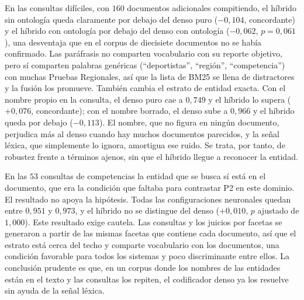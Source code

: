 \documentclass[11pt,letterpaper]{article}
\numberwithin{equation}{section}
\begin{document}
En las consultas difíciles, con $160$ documentos adicionales compitiendo, el híbrido sin ontología queda claramente por debajo del denso puro ($-0{,}104$, concordante) y el híbrido con ontología por debajo del denso con ontología ($-0{,}062$, $p=0{,}061$), una desventaja que en el corpus de diecisiete documentos no se había confirmado. Las paráfrasis no comparten vocabulario con su reporte objetivo, pero sí comparten palabras genéricas (``deportistas'', ``región'', ``competencia'') con muchas Pruebas Regionales, así que la lista de BM25 se llena de distractores y la fusión los promueve. También cambia el estrato de entidad exacta. Con el nombre propio en la consulta, el denso puro cae a $0{,}749$ y el híbrido lo supera ($+0{,}076$, concordante); con el nombre borrado, el denso sube a $0{,}966$ y el híbrido queda por debajo ($-0{,}113$). El nombre, que no figura en ningún documento, perjudica más al denso cuando hay muchos documentos parecidos, y la señal léxica, que simplemente lo ignora, amortigua ese ruido. Se trata, por tanto, de robustez frente a términos ajenos, sin que el híbrido llegue a reconocer la entidad.

En las $53$ consultas de competencias la entidad que se busca sí está en el documento, que era la condición que faltaba para contrastar P2 en este dominio. El resultado no apoya la hipótesis. Todas las configuraciones neuronales quedan entre $0{,}951$ y $0{,}973$, y el híbrido no se distingue del denso ($+0{,}010$, $p$ ajustado de $1{,}000$). Este resultado exige cautela. Las consultas y los juicios por facetas se generaron a partir de las mismas facetas que contiene cada documento, así que el estrato está cerca del techo y comparte vocabulario con los documentos, una condición favorable para todos los sistemas y poco discriminante entre ellos. La conclusión prudente es que, en un corpus donde los nombres de las entidades están en el texto y las consultas los repiten, el codificador denso ya los resuelve sin ayuda de la señal léxica.
\end{document}

